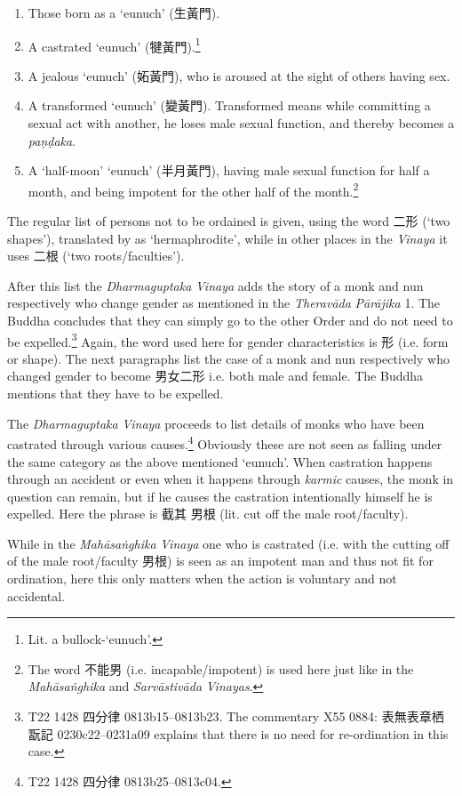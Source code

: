 \begin{enumerate}
\item Those born as a `eunuch' (生黃門). 
\item A castrated `eunuch' (犍黃門).\footnote{Lit. a bullock-`eunuch'.}
\item A jealous `eunuch' (妬黃門), who is aroused at the sight of others having sex.
\item A transformed `eunuch' (變黃門). Transformed means while committing a sexual act with another, he loses male sexual function, and thereby becomes a {\em paṇḍaka}.
\item A `half-moon' `eunuch' (半月黃門), having male sexual function for half a month, and being impotent for the other half of the month.\footnote{The word 不能男 (i.e. incapable/impotent) is used here just like in the {\em Mahāsaṅghika} and {\em Sarvāstivāda} {\em Vinayas}.}
\end{enumerate}

The regular list of persons not to be ordained is given, using the word 二形 (`two shapes'), translated by \cite{bodhi} as `hermaphrodite', while in other places in the {\em Vinaya} it uses 二根 (`two roots/faculties'). 

After this list the {\em Dharmaguptaka} {\em Vinaya} adds the story of a monk and nun respectively who change gender as mentioned in the {\em Theravāda} {\em Pārājika} 1. The Buddha concludes that they can simply go to the other Order and do not need to be expelled.\footnote{T22 1428 四分律 0813b15–0813b23. The commentary X55 0884: 表無表章栖翫記 0230c22–0231a09 explains that there is no need for re-ordination in this case.} Again, the word used here for gender characteristics is 形 (i.e. form or shape). The next paragraphs list the case of a monk and nun respectively who changed gender to become 男女二形 i.e. both male and female. The Buddha mentions that they have to be expelled.

The {\em Dharmaguptaka} {\em Vinaya} proceeds to list details of monks who have been castrated through various causes.\footnote{T22 1428 四分律 0813b25–0813c04.} Obviously these are not seen as falling under the same category as the above mentioned `eunuch'. When castration happens through an accident or even when it happens through {\em karmic} causes, the monk in question can remain, but if he causes the castration intentionally himself he is expelled. Here the phrase is 截其 男根 (lit. cut off the male root/faculty).

While in the {\em Mahāsaṅghika} {\em Vinaya} one who is castrated (i.e. with the cutting off of the male root/faculty 男根) is seen as an impotent man and thus not fit for ordination, here this only matters when the action is voluntary and not accidental.


